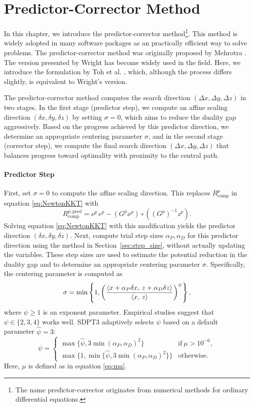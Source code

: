 \section{Predictor-Corrector Method}
In this chapter, we introduce the predictor-corrector method\footnote{The name predictor-corrector originates from numerical methods for ordinary differential equations.}.
This method is widely adopted in many software packages as an practically efficient way to solve problems.
The predictor-corrector method was originally proposed by Mehrotra \cite{Mehrotra1992}.
The version presented by Wright \cite{Wright1997} has become widely used in the field.
Here, we introduce the formulation by Toh et al. \cite{toh1999}, which, although the process differs slightly, is equivalent to Wright's version.

The predictor-corrector method computes the search direction $(\Delta x, \Delta y, \Delta z)$ in two stages.
In the first stage (predictor step), we compute an affine scaling direction $(\delta x, \delta y, \delta z)$ by setting $\sigma = 0$, which aims to reduce the duality gap aggressively.
Based on the progress achieved by this predictor direction, we determine an appropriate centering parameter $\sigma$, and in the second stage (corrector step), we compute the final search direction $(\Delta x, \Delta y, \Delta z)$ that balances progress toward optimality with proximity to the central path.


\paragraph{Predictor Step}
First, set $\sigma=0$ to compute the affine scaling direction.
This replaces $R^p_{\text{comp}}$ in equation \eqref{eq:NewtonKKT} with
\[R^{p,\text{pred}}_{\text{comp}}=\nu^p \, e^p - (G^p x^p) \circ ((G^p)^{-1} z^p).\]
Solving equation \eqref{eq:NewtonKKT} with this modification yields the predictor direction $(\delta x, \delta y, \delta z)$.
Next, compute trial step sizes $\alpha_P, \alpha_D$ for this predictor direction using the method in Section~\ref{sec:step_size}, without actually updating the variables.
These step sizes are used to estimate the potential reduction in the duality gap and to determine an appropriate centering parameter $\sigma$.
Specifically, the centering parameter is computed as
\[
   \sigma=\min\left\{1, \left(\frac{\left\langle x + \alpha_P \delta x, \, z + \alpha_D \delta z \right\rangle}{\left\langle x, \, z \right\rangle}\right)^\psi\right\},
\]
where $\psi \ge 1$ is an exponent parameter.
Empirical studies suggest that $\psi \in \{2,3,4\}$ works well.
SDPT3 adaptively selects $\psi$ based on a default parameter $\hat{\psi}=3$:
\[
\psi = \begin{cases}
    \max\{\hat{\psi}, 3 \min(\alpha_P, \alpha_D)^2\} & \text{if} ~ \mu > 10^{-6}, \\
    \max\{1, \min\{\hat{\psi}, 3 \min(\alpha_P, \alpha_D)^2\}\} & \text{otherwise}.
\end{cases}
\]
Here, $\mu$ is defined as in equation \eqref{eq:mu}.

